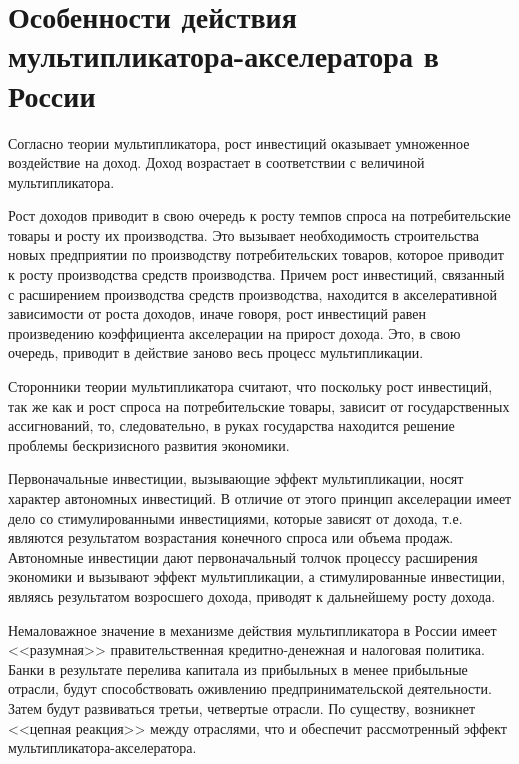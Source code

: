 \pagebreak %

\chapter{Особенности действия мультипликатора-акселератора в России}

Согласно теории мультипликатора, рост инвестиций оказывает умноженное
воздействие на доход. Доход возрастает в соответствии с величиной
мультипликатора.

Рост доходов приводит в свою очередь к росту темпов спроса на потребительские
товары и росту их производства. Это вызывает необходимость строительства новых
предприятии по производству потребительских товаров, которое приводит к росту
производства средств производства. Причем рост инвестиций, связанный с
расширением производства средств производства, находится в акселеративной
зависимости от роста доходов, иначе говоря, рост инвестиций равен произведению
коэффициента акселерации на прирост дохода. Это, в свою очередь, приводит в
действие заново весь процесс мультипликации.

Сторонники теории мультипликатора считают, что поскольку рост инвестиций, так
же как и рост спроса на потребительские товары, зависит от государственных
ассигнований, то, следовательно, в руках государства находится решение проблемы
бескризисного развития экономики.

Первоначальные инвестиции, вызывающие эффект мультипликации, носят характер
автономных инвестиций. В отличие от этого принцип акселерации имеет дело со
стимулированными инвестициями, которые зависят от дохода, т.е. являются
результатом возрастания конечного спроса или объема продаж. Автономные
инвестиции дают первоначальный толчок процессу расширения экономики и вызывают
эффект мультипликации, а стимулированные инвестиции, являясь результатом
возросшего дохода, приводят к дальнейшему росту дохода.

Немаловажное значение в механизме действия мультипликатора в России имеет
<<разумная>> правительственная кредитно-денежная и налоговая политика. Банки в
результате перелива капитала из прибыльных в менее прибыльные отрасли, будут
способствовать оживлению предпринимательской деятельности. Затем будут
развиваться третьи, четвертые отрасли. По существу, возникнет <<цепная
реакция>> между отраслями, что и обеспечит рассмотренный эффект
мультипликатора-акселератора.

\pagebreak %


